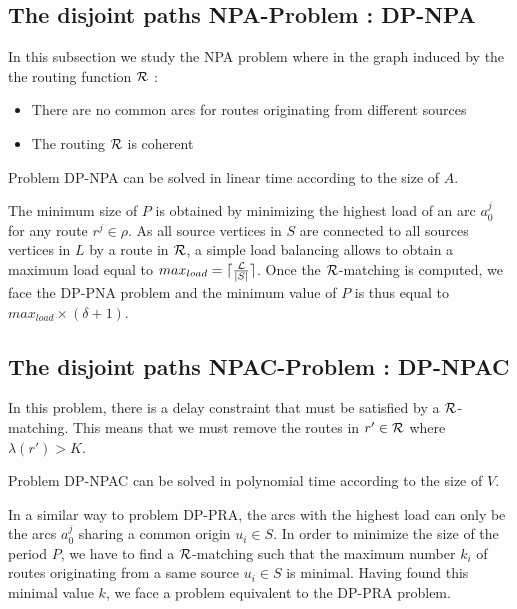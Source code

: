 \documentclass{article}
\newcommand\rmatching{$\cal R$-matching\xspace}
\begin{document}
\subsection{The disjoint paths NPA-Problem : DP-NPA}

In this subsection we study the NPA problem where in the graph induced by the the routing function $\cal R$ :
\begin{itemize}
\item There are no common arcs for routes originating from different sources
\item The routing $\cal R$ is coherent 
\end{itemize}

\begin{proposition}
\label{DP-NPA}
Problem DP-NPA can be solved in linear time according to the size of $A$.
\end{proposition}

The minimum size of $P$ is obtained by minimizing the highest load of an arc $a_0^j$ for any route $r^j \in \rho$. As all source vertices in $S$ are connected to all sources vertices in $L$ by a route in $\cal R$, a simple load balancing allows to obtain a maximum load equal to  $max_{load} = \lceil \frac{\cal L}{|S|} \rceil$. Once the \rmatching is computed, we face the DP-PNA problem and the minimum value of $P$ is thus equal to $max_{load} \times (\delta + 1)$.
 
\subsection{The disjoint paths NPAC-Problem : DP-NPAC}

In this problem, there is a delay constraint that must be satisfied by a \rmatching. This means that we must remove the routes in $r' \in \cal R$ where $\lambda(r') > K$.

\begin{proposition}
\label{DP-NPAC}
Problem DP-NPAC can be solved in polynomial time according to the size of $V$.
\end{proposition}

In a similar way to problem DP-PRA, the arcs with the highest load can only be the arcs $a_0^j$ sharing a common origin $u_i \in S$. In order to minimize the size of the period $P$, we have to find a \rmatching such that the maximum number $k_i$ of routes originating from a same source $u_i \in S$ is minimal. Having found this minimal value $k$, we face a problem equivalent to the DP-PRA problem.
\end{document}
